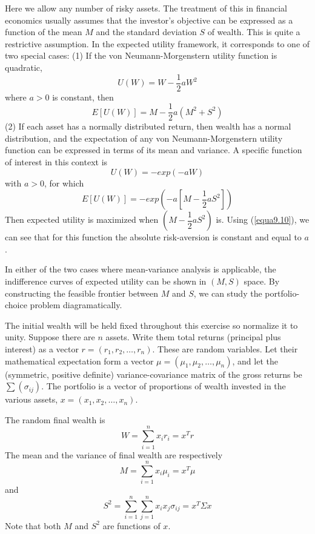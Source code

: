 Here we allow any number of risky assets. The treatment of this in financial economics usually assumes that the investor's objective can be expressed as a function of the mean $M$ and the standard deviation $S$ of wealth. This is quite a restrictive assumption. In the expected utility framework, it corresponds to one of two special cases: (1) If the von Neumann-Morgenstern utility function is quadratic,
\begin{equation*}
U(W) = W - \dfrac{1}{2} a W^2
\end{equation*}
where $a>0$ is constant, then
\begin{equation*}
E[U(W)] = M -\dfrac{1}{2} a (M^2 + S^2)
\end{equation*}
(2) If each asset has a normally distributed return, then wealth has a normal distribution, and the expectation of any von Neumann-Morgenstern utility function can be expressed in terms of its mean and variance. A specific function of interest in this context is 
\begin{equation*}
U(W) = -exp(-aW)
\end{equation*}
with $a>0$, for which
\begin{equation*}
E[U(W)] =  - exp(-a[M -\dfrac{1}{2} a S^2]) 
\end{equation*}
Then expected utility is maximized when $(M-\dfrac{1}{2} a S^2)$ is. Using (\ref{equa9.10}), we can see that for this function the absolute risk-aversion is constant and equal to $a$.

In either of the two cases where mean-variance analysis is applicable, the indifference curves of expected utility can be shown in $(M,S)$ space. By constructing the feasible frontier between $M$ and $S$, we can study the portfolio-choice problem diagramatically.

The initial wealth will be held fixed throughout this exercise so normalize it to unity. Suppose there are $n$ assets. Write them total returns (principal plus interest) as a vector $r=(r_1, r_2, \dots, r_n)$. These are random variables. Let their mathematical expectation form a vector $\mu = (\mu_1, \mu_2, \dots, \mu_n)$, and let the (symmetric, positive definite) variance-covariance matrix of the gross returns be $\sum ( \sigma_{ij} )$. The portfolio is a vector of proportions of wealth invested in the various assets, $x=(x_1, x_2, \dots, x_n)$.

The random final wealth is 
\begin{equation*}
W = \sum\limits_{i=1}^n x_i r_i = x^T r
\end{equation*}
The mean and the variance of final wealth are respectively
\begin{equation*}
M = \sum\limits_{i=1}^n x_i \mu_i = x^T \mu
\end{equation*}
and
\begin{equation*}
S^2 = \sum\limits_{i=1}^n \sum\limits_{j=1}^n  x_i x_j \sigma_{ij} = x^T \Sigma x
\end{equation*}
Note that both $M$ and $S^2$ are functions of $x$.

